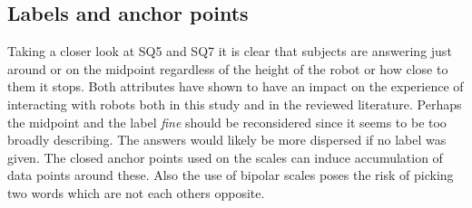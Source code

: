 \subsection{Labels and anchor points}
Taking a closer look at SQ5 and SQ7 it is clear that subjects are answering just around or on the midpoint regardless of the height of the robot or how close to them it stops. Both attributes have shown to have an impact on the experience of interacting with robots both in this study and in the reviewed literature. Perhaps the midpoint and the label \textit{fine} should be reconsidered since it seems to be too broadly describing. The answers would likely be more dispersed if no label was given. The closed anchor points used on the scales can induce accumulation of data points around these. Also the use of bipolar scales poses the risk of picking two words which are not  each others opposite.